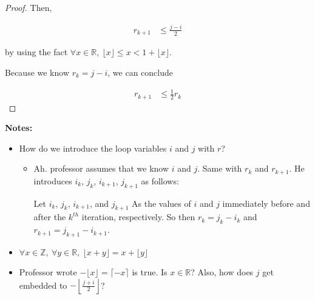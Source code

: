 \documentclass[12pt]{article}
\begin{document}
\begin{enumerate}[a.]
\begin{proof}
        Then,

        \begin{align}
            r_{k+1} &\leq \frac{j - i}{2}
        \end{align}

        by using the fact $\forall x \in \mathbb{R},\: \lfloor x \rfloor \leq x < 1 + \lfloor x \rfloor$.

        \bigskip

        Because we know $r_k = j - i$, we can conclude

        \begin{align}
            r_{k+1} &\leq \frac{1}{2} r_k
        \end{align}
    \end{proof}

    \textbf{Notes:}

    \begin{itemize}
        \item

        How do we introduce the loop variables $i$ and $j$ with $r$?

        \bigskip

        \begin{itemize}
            \item Ah. professor assumes that we know $i$ and $j$. Same with $r_k$
            and $r_{k+1}$. He introduces $i_k$, $j_k$, $i_{k+1}$, $j_{k+1}$ as follows:

            \bigskip

            \begin{mdframed}
                Let $i_k$, $j_k$, $i_{k+1}$, and $j_{k+1}$ As the values of $i$
                and $j$ immediately before and after the $k^{th}$ iteration, respectively.
                So then $r_k = j_k - i_k$ and $r_{k+1} = j_{k+1} - i_{k+1}$.
            \end{mdframed}

        \end{itemize}
        \item $\forall x \in \mathbb{Z},\:\forall y \in \mathbb{R},\:\lfloor x+y \rfloor = x + \lfloor y \rfloor$
        \item Professor wrote $- \lfloor x \rfloor = \lceil -x \rceil$ is true. Is $x \in \mathbb{R}$? Also, how
        does $j$ get embedded to $- \left\lfloor \frac{j + i}{2} \right\rfloor$?

    \end{itemize}



\end{enumerate}
\end{document}
